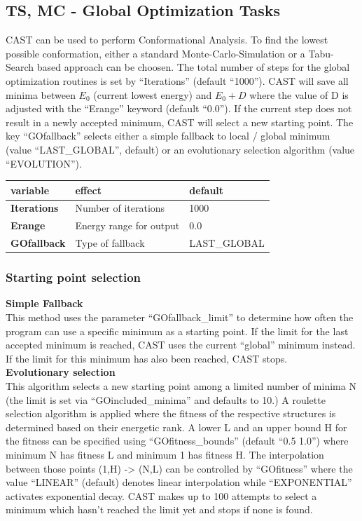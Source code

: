 \documentclass[10pt,a4paper]{article} %
\begin{document}
	\subsection{TS, MC - Global Optimization Tasks}
	\ac{CAST} can be used to perform Conformational Analysis. To find the lowest possible conformation, either a standard Monte-Carlo-Simulation\supercite{mc_original, mmc_original} or a Tabu-Search\cite{tabusearch_original1, tabusearch_original2, tabusearch_original3} based approach can be choosen. The total number of steps for the global optimization routines is set by ``Iterations'' (default ``1000''). \ac{CAST} will save all minima between $E_0$ (current lowest energy) and $E_0 + D$ where the value of D is adjusted with the ``Erange'' keyword (default ``0.0'').
	If the current step does not result in a newly accepted minimum, \ac{CAST} will select a new starting point. The key ``GOfallback'' selects either a simple fallback to local / global minimum (value ``LAST\_GLOBAL'', default) or an evolutionary selection algorithm (value ``EVOLUTION'').
	
	\begin{longtable}{l|l|l}
	variable & effect & default \\
	\hline
	\textbf{Iterations} & Number of iterations & 1000 \\
	\textbf{Erange} & Energy range for output & 0.0 \\
		\textbf{GOfallback} & Type of fallback & LAST\_GLOBAL \\
	\end{longtable}
	
	\subsubsection{Starting point selection}
	\textbf{Simple Fallback} \\
	This method uses the parameter ``GOfallback\_limit'' to determine how often the program can use a specific minimum as a starting point. If the limit for the last accepted minimum is reached, \ac{CAST} uses the current ``global'' minimum instead. If the limit for this minimum has also been reached, \ac{CAST} stops.\\
		
	\textbf{Evolutionary selection} \\
	This algorithm selects a new starting point among a limited number of minima N (the limit is set via ``GOincluded\_minima'' and defaults to 10.)
	A roulette selection algorithm is applied where the fitness of the respective structures is determined based on their energetic rank. A lower L and an upper bound H for the fitness can be specified using ``GOfitness\_bounds'' (default ``0.5 1.0'') where minimum N has fitness L and minimum 1 has fitness H.
	The interpolation between those points (1,H) -> (N,L) can be controlled by ``GOfitness'' where the value ``LINEAR'' (default) denotes linear interpolation while ``EXPONENTIAL'' activates exponential decay.
	\ac{CAST} makes up to 100 attempts to select a minimum which hasn't reached the limit yet and stops if none is found.
	
\end{document}
